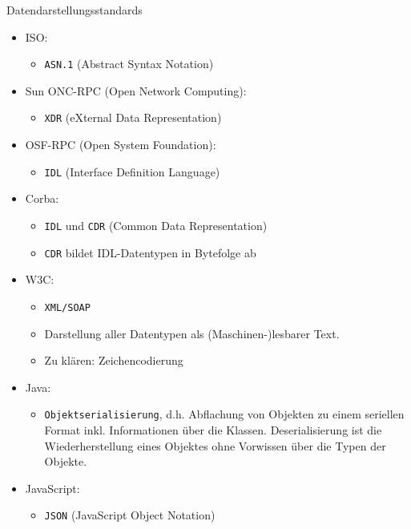 \begin{example}{Datendarstellungsstandards}
    \begin{itemize}
        \item ISO:

              \begin{itemize}
                  \item \texttt{ASN.1} (Abstract Syntax Notation)
              \end{itemize}
        \item Sun ONC-RPC (Open Network Computing):

              \begin{itemize}
                  \item \texttt{XDR} (eXternal Data Representation)
              \end{itemize}
        \item OSF-RPC (Open System Foundation):

              \begin{itemize}
                  \item \texttt{IDL} (Interface Definition Language)
              \end{itemize}
        \item Corba:

              \begin{itemize}
                  \item \texttt{IDL} und \texttt{CDR} (Common Data Representation)
                  \item \texttt{CDR} bildet IDL-Datentypen in Bytefolge ab
              \end{itemize}
        \item W3C:

              \begin{itemize}
                  \item \texttt{XML/SOAP}
                  \item Darstellung aller Datentypen als (Maschinen-)lesbarer Text.
                  \item Zu klären: Zeichencodierung
              \end{itemize}
        \item Java:

              \begin{itemize}
                  \item \texttt{Objektserialisierung}, d.h. Abflachung von Objekten zu einem seriellen Format inkl. Informationen über die Klassen.
                        Deserialisierung ist die Wiederherstellung eines Objektes ohne Vorwissen über die Typen der Objekte.
              \end{itemize}
        \item JavaScript:

              \begin{itemize}
                  \item \texttt{JSON} (JavaScript Object Notation)
              \end{itemize}
    \end{itemize}
\end{example}

